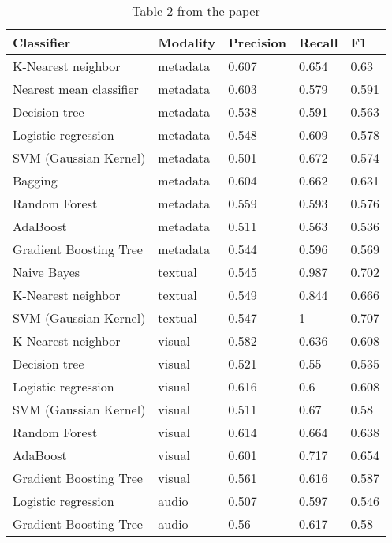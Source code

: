\documentclass[sigconf]{acmart}
\begin{document}
\begin{table}[hbt!]
  \caption*{Table 2 from the paper}
  \begin{tabular}{lllll}
    \hline
    Classifier              & Modality & Precision & Recall & F1    \\ \hline
    K-Nearest neighbor      & metadata & 0.607     & 0.654  & 0.63  \\
    Nearest mean classifier & metadata & 0.603     & 0.579  & 0.591 \\
    Decision tree           & metadata & 0.538     & 0.591  & 0.563 \\
    Logistic regression     & metadata & 0.548     & 0.609  & 0.578 \\
    SVM (Gaussian Kernel)   & metadata & 0.501     & 0.672  & 0.574 \\
    Bagging                 & metadata & 0.604     & 0.662  & 0.631 \\
    Random Forest           & metadata & 0.559     & 0.593  & 0.576 \\
    AdaBoost                & metadata & 0.511     & 0.563  & 0.536 \\
    Gradient Boosting Tree  & metadata & 0.544     & 0.596  & 0.569 \\
    Naive Bayes             & textual  & 0.545     & 0.987  & 0.702 \\
    K-Nearest neighbor      & textual  & 0.549     & 0.844  & 0.666 \\
    SVM (Gaussian Kernel)   & textual  & 0.547     & 1      & 0.707 \\
    K-Nearest neighbor      & visual   & 0.582     & 0.636  & 0.608 \\
    Decision tree           & visual   & 0.521     & 0.55   & 0.535 \\
    Logistic regression     & visual   & 0.616     & 0.6    & 0.608 \\
    SVM (Gaussian Kernel)   & visual   & 0.511     & 0.67   & 0.58  \\
    Random Forest           & visual   & 0.614     & 0.664  & 0.638 \\
    AdaBoost                & visual   & 0.601     & 0.717  & 0.654 \\
    Gradient Boosting Tree  & visual   & 0.561     & 0.616  & 0.587 \\
    Logistic regression     & audio    & 0.507     & 0.597  & 0.546 \\
    Gradient Boosting Tree  & audio    & 0.56      & 0.617  & 0.58  \\ \hline
  \end{tabular}
\end{table}
\end{document}
